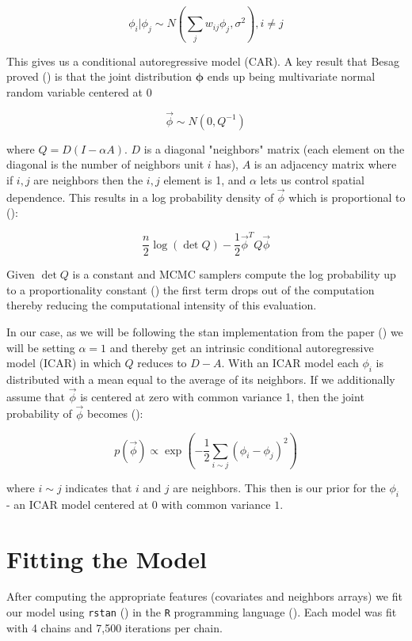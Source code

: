 \documentclass[11pt]{article}
\newcommand{\code}[1]{\colorbox{light-gray}{\texttt{#1}}}
\begin{document}
$$\phi_i | \phi_j \sim N\left(\sum_j w_{ij}\phi_j, \sigma^2  \right), i\neq j$$

This gives us a conditional autoregressive model (CAR). A key result that Besag proved (\cite{besag}) is that the joint distribution $\bm{\phi}$ ends up being multivariate normal random variable centered at 0

$$\vec{\phi}\sim N(0, Q^{-1})$$

where $Q=D(I-\alpha A)$. $D$ is a diagonal "neighbors" matrix (each element on the diagonal is the number of neighbors unit $i$ has), $A$ is an adjacency matrix where if $i,j$ are neighbors then the $i,j$ element is 1, and $\alpha$ lets us control spatial dependence. This results in a log probability density of $\vec{\phi}$ which is proportional to (\cite{bymstan}):

$$\frac{n}{2}\log{(\det{Q})}-\frac{1}{2}\vec{\phi}^T Q \vec{\phi}$$

Given $\det{Q}$ is a constant and MCMC samplers compute the log probability up to a proportionality constant (\cite{bymstan}) the first term drops out of the computation thereby reducing the computational intensity of this evaluation. 

In our case, as we will be following the stan implementation from the paper (\cite{bymstan}) we will be setting $\alpha=1$ and thereby get an intrinsic conditional autoregressive model (ICAR) in which $Q$ reduces to $D-A$. With an ICAR model each $\phi_i$ is distributed with a mean equal to the average of its neighbors. If we additionally assume that $\vec{\phi}$ is centered at zero with common variance 1, then the joint probability of $\vec{\phi}$ becomes (\cite{bymstan}):

$$p(\vec{\phi})\propto \exp{\left( -\frac{1}{2} \sum_{i\sim j} (\phi_i - \phi_j)^2 \right)}$$

where $i \sim j$ indicates that $i$ and $j$ are neighbors. This then is our prior for the $\phi_i$ - an ICAR model centered at $0$ with common variance $1$. 

\newpage

\section{Fitting the Model}

After computing the appropriate features (covariates and neighbors arrays) we fit our model using \code{rstan} (\cite{rstan}) in the \code{R} programming language (\cite{R}). Each model was fit with 4 chains and 7,500 iterations per chain. \newline
\end{document}
